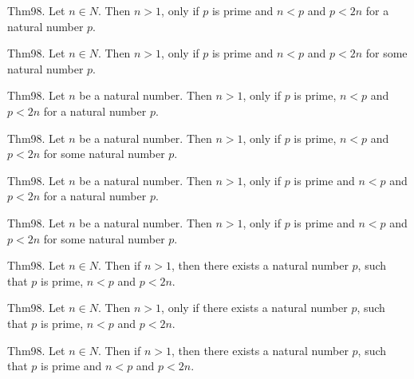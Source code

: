 \documentclass{article}
\begin{document}
Thm98. Let $n \in N$. Then $n > 1$, only if $p$ is prime and $n < p$ and $p < 2 n$ for a natural number $p$.

Thm98. Let $n \in N$. Then $n > 1$, only if $p$ is prime and $n < p$ and $p < 2 n$ for some natural number $p$.

Thm98. Let $n$ be a natural number. Then $n > 1$, only if $p$ is prime, $n < p$ and $p < 2 n$ for a natural number $p$.

Thm98. Let $n$ be a natural number. Then $n > 1$, only if $p$ is prime, $n < p$ and $p < 2 n$ for some natural number $p$.

Thm98. Let $n$ be a natural number. Then $n > 1$, only if $p$ is prime and $n < p$ and $p < 2 n$ for a natural number $p$.

Thm98. Let $n$ be a natural number. Then $n > 1$, only if $p$ is prime and $n < p$ and $p < 2 n$ for some natural number $p$.

Thm98. Let $n \in N$. Then if $n > 1$, then there exists a natural number $p$, such that $p$ is prime, $n < p$ and $p < 2 n$.

Thm98. Let $n \in N$. Then $n > 1$, only if there exists a natural number $p$, such that $p$ is prime, $n < p$ and $p < 2 n$.

Thm98. Let $n \in N$. Then if $n > 1$, then there exists a natural number $p$, such that $p$ is prime and $n < p$ and $p < 2 n$.
\end{document}
